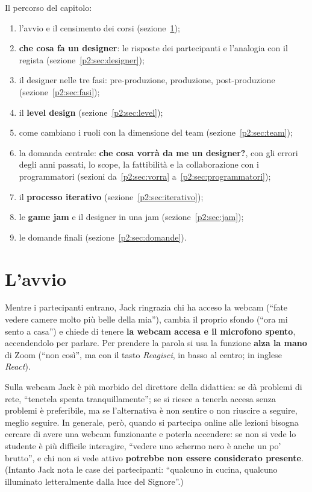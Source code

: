 Il percorso del capitolo:
\begin{enumerate}
  \item l'avvio e il censimento dei corsi (sezione~\ref{p2:sec:avvio});
  \item \textbf{che cosa fa un designer}: le risposte dei partecipanti e
        l'analogia con il regista (sezione~\ref{p2:sec:designer});
  \item il designer nelle tre fasi: pre-produzione, produzione,
        post-produzione (sezione~\ref{p2:sec:fasi});
  \item il \textbf{level design} (sezione~\ref{p2:sec:level});
  \item come cambiano i ruoli con la dimensione del team
        (sezione~\ref{p2:sec:team});
  \item la domanda centrale: \textbf{che cosa vorrà da me un designer?},
        con gli errori degli anni passati, lo scope, la fattibilità e la
        collaborazione con i programmatori (sezioni
        da~\ref{p2:sec:vorra} a~\ref{p2:sec:programmatori});
  \item il \textbf{processo iterativo} (sezione~\ref{p2:sec:iterativo});
  \item le \textbf{game jam} e il designer in una jam
        (sezione~\ref{p2:sec:jam});
  \item le domande finali (sezione~\ref{p2:sec:domande}).
\end{enumerate}

\section{L'avvio}
\label{p2:sec:avvio}

Mentre i partecipanti entrano, Jack ringrazia chi ha acceso la webcam
(``fate vedere camere molto più belle della mia''), cambia il proprio sfondo
(``ora mi sento a casa'') e chiede di tenere \textbf{la webcam accesa e il
microfono spento}, accendendolo per parlare. Per prendere la parola si usa
la funzione \textbf{alza la mano} di Zoom (``non così'', ma con il tasto
\emph{Reagisci}, in basso al centro; in inglese \emph{React}).

Sulla webcam Jack è più morbido del direttore della didattica: se dà
problemi di rete, ``tenetela spenta tranquillamente''; se si riesce a tenerla
accesa senza problemi è preferibile, ma se l'alternativa è non sentire o non
riuscire a seguire, meglio seguire. In generale, però, quando si partecipa
online alle lezioni bisogna cercare di avere una webcam funzionante e
poterla accendere: se non si vede lo studente è più difficile interagire,
``vedere uno schermo nero è anche un po' brutto'', e chi non si vede attivo
\textbf{potrebbe non essere considerato presente}. (Intanto Jack nota le
case dei partecipanti: ``qualcuno in cucina, qualcuno illuminato
letteralmente dalla luce del Signore''.)

